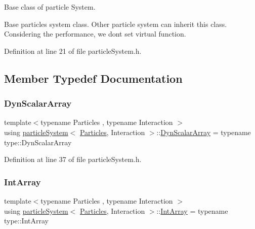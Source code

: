 Base class of particle System. 

Base particles system class. Other particle system can inherit this class. Considering the performance, we don\textquotesingle{}t set virtual function. 

Definition at line 21 of file particle\+System.\+h.



\subsection{Member Typedef Documentation}
\mbox{\label{classparticle_system_a768fe562ed8dcc0973f3d422708835bf}} 
\subsubsection{\texorpdfstring{Dyn\+Scalar\+Array}{DynScalarArray}}
{\footnotesize\ttfamily template$<$typename Particles , typename Interaction $>$ \\
using \mbox{\hyperlink{classparticle_system}{particle\+System}}$<$ \mbox{\hyperlink{struct_particles}{Particles}}, Interaction $>$\+::\mbox{\hyperlink{classparticle_system_a768fe562ed8dcc0973f3d422708835bf}{Dyn\+Scalar\+Array}} =  typename type\+::\+Dyn\+Scalar\+Array}



Definition at line 37 of file particle\+System.\+h.

\mbox{\label{classparticle_system_aea9c70dc1a9d1947b425f5383fb21e24}} 
\subsubsection{\texorpdfstring{Int\+Array}{IntArray}}
{\footnotesize\ttfamily template$<$typename Particles , typename Interaction $>$ \\
using \mbox{\hyperlink{classparticle_system}{particle\+System}}$<$ \mbox{\hyperlink{struct_particles}{Particles}}, Interaction $>$\+::\mbox{\hyperlink{classparticle_system_aea9c70dc1a9d1947b425f5383fb21e24}{Int\+Array}} =  typename type\+::\+Int\+Array}



